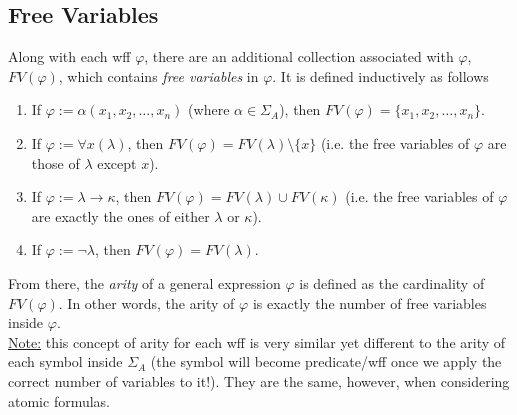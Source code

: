 \documentclass{treatise}
\begin{document}
\subsection{Free Variables}
Along with each wff $\varphi$, there are an additional collection associated with $\varphi$, $FV(\varphi)$, which contains \emph{free variables} in $\varphi$. It is defined inductively as follows
\begin{enumerate}
    \item If $\varphi := \alpha(x_1, x_2, \hdots, x_n)$ (where $\alpha \in \Sigma_A$), then $FV(\varphi) = \{ x_1, x_2, \hdots, x_n \}$.
    \item If $\varphi := \forall x (\lambda)$, then $FV(\varphi) = FV(\lambda) \setminus \{ x \}$ (i.e. the free variables of $\varphi$ are those of $\lambda$ except $x$).
    \item If $\varphi := \lambda \to \kappa$, then $FV(\varphi) = FV(\lambda) \cup FV(\kappa)$ (i.e. the free variables of $\varphi$ are exactly the ones of either $\lambda$ or $\kappa$).
    \item If $\varphi := \neg \lambda$, then $FV(\varphi) = FV(\lambda)$.
\end{enumerate}
From there, the \emph{arity} of a general expression $\varphi$ is defined as the cardinality of $FV(\varphi)$. In other words, the arity of $\varphi$ is exactly the number of free variables inside $\varphi$.
\\
\underline{Note:} this concept of arity for each wff is very similar yet different to the arity of each symbol inside $\Sigma_A$ (the symbol will become predicate/wff once we apply the correct number of variables to it!). They are the same, however, when considering atomic formulas.
\end{document}
